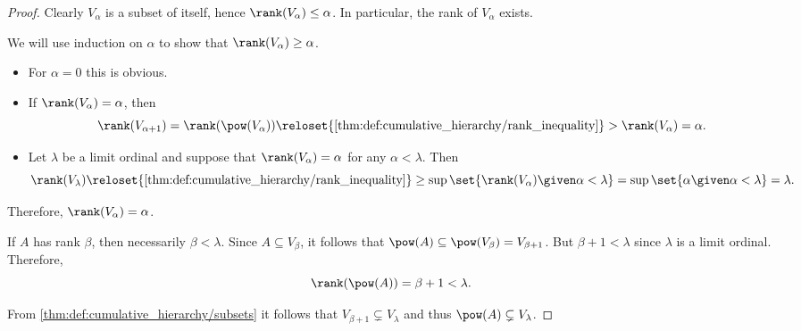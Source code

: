 \begin{proof}
   Clearly \( V_\alpha \) is a subset of itself, hence \( \rank(V_\alpha) \leq \alpha \). In particular, the rank of \( V_\alpha \) exists.

  We will use induction on \( \alpha \) to show that \( \rank(V_\alpha) \geq \alpha \).
  \begin{itemize}
    \item For \( \alpha = 0 \) this is obvious.
    \item If \( \rank(V_\alpha) = \alpha \), then
    \begin{equation*}
      \rank(V_{\alpha + 1})
      =
      \rank(\pow(V_\alpha))
      \reloset {\ref{thm:def:cumulative_hierarchy/rank_inequality}} >
      \rank(V_\alpha)
      =
      \alpha.
    \end{equation*}

    \item Let \( \lambda \) be a limit ordinal and suppose that \( \rank(V_\alpha) = \alpha \) for any \( \alpha < \lambda \). Then
    \begin{equation*}
      \rank(V_\lambda)
      \reloset {\ref{thm:def:cumulative_hierarchy/rank_inequality}} \geq
      \sup\set{ \rank(V_\alpha) \given \alpha < \lambda }
      =
      \sup\set{ \alpha \given \alpha < \lambda }
      =
      \lambda.
    \end{equation*}
  \end{itemize}

  Therefore, \( \rank(V_\alpha) = \alpha \).

   If \( A \) has rank \( \beta \), then necessarily \( \beta < \lambda \). Since \( A \subseteq V_\beta \), it follows that \( \pow(A) \subseteq \pow(V_\beta) = V_{\beta + 1} \). But \( \beta + 1 < \lambda \) since \( \lambda \) is a limit ordinal. Therefore,
  \begin{equation*}
    \rank(\pow(A)) = \beta + 1 < \lambda.
  \end{equation*}

  From \cref{thm:def:cumulative_hierarchy/subsets} it follows that \( V_{\beta + 1} \subsetneq V_\lambda \) and thus \( \pow(A) \subsetneq V_\lambda \).
\end{proof}

